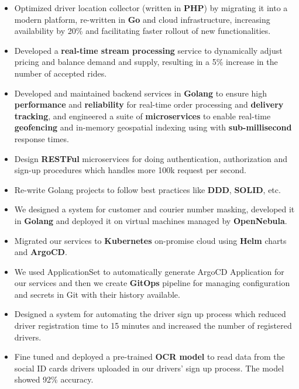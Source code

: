 \begin{itemize}
      \item Optimized driver location collector (written in \textbf{PHP}) by migrating it into a modern platform, re-written in \textbf{Go} and cloud infrastructure,
            increasing availability by 20\% and facilitating faster rollout of new functionalities.
      \item Developed a \textbf{real-time stream processing} service to dynamically adjust pricing and balance demand and supply,
            resulting in a 5\% increase in the number of accepted rides.
      \item Developed and maintained backend services in \textbf{Golang} to ensure
            high \textbf{performance} and \textbf{reliability} for real-time order processing and \textbf{delivery tracking},
            and engineered a suite of \textbf{microservices} to enable real-time \textbf{geofencing} and in-memory geospatial
            indexing using  with \textbf{sub-millisecond} response times.
      \item Design \textbf{RESTFul} microservices for doing authentication, authorization and sign-up procedures which handles more 100k request per second.
      \item Re-write Golang projects to follow best practices like \textbf{DDD}, \textbf{SOLID}, etc.
      \item We designed a system for customer and courier number masking, developed it in \textbf{Golang}
            and deployed it on virtual machines managed by \textbf{OpenNebula}.
      \item Migrated our services to \textbf{Kubernetes} on-promise cloud using \textbf{Helm} charts and \textbf{ArgoCD}.
      \item We used  ApplicationSet to automatically generate ArgoCD Application
            for our services and then we create \textbf{GitOps} pipeline for managing configuration
            and secrets in Git with their history available.
      \item Designed a system for automating the driver sign up process which reduced driver registration time to 15 minutes and increased the number of registered drivers.
      \item Fine tuned and deployed a pre-trained \textbf{OCR model} to read data from the social ID cards drivers uploaded in our drivers' sign up process. The model showed 92\% accuracy.

\end{itemize}
